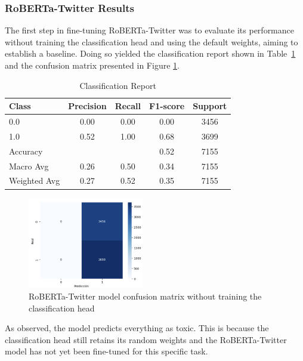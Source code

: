 \subsubsection{RoBERTa-Twitter Results}

The first step in fine-tuning RoBERTa-Twitter was to evaluate its performance without training the classification head and using the default weights, aiming to establish a baseline. Doing so yielded the classification report shown in Table~\ref{tab:classification_report_1} and the confusion matrix presented in Figure \ref{fig:confusion_matrix_roberta_shapeY_no_head}.

\begin{table}[H]
\centering
\caption{Classification Report}
\label{tab:classification_report_1}
\begin{tabular}{lcccc}
\toprule
Class        & Precision & Recall & F1-score & Support \\
\midrule
0.0          & 0.00      & 0.00   & 0.00     & 3456    \\
1.0          & 0.52      & 1.00   & 0.68     & 3699    \\
\midrule
Accuracy     &           &        & 0.52     & 7155    \\
Macro Avg    & 0.26      & 0.50   & 0.34     & 7155    \\
Weighted Avg & 0.27      & 0.52   & 0.35     & 7155    \\
\bottomrule
\end{tabular}
\end{table}

\begin{figure}[H]
    \centering
    \includegraphics[width=0.45\textwidth]{images/confusion_matrix_bilstm_shapeY.png}
    \caption{RoBERTa-Twitter model confusion matrix without training the classification head}
    \label{fig:confusion_matrix_roberta_shapeY_no_head}
\end{figure}


As observed, the model predicts everything as toxic. This is because the classification head still retains its random weights and the RoBERTa-Twitter model has not yet been fine-tuned for this specific task.

